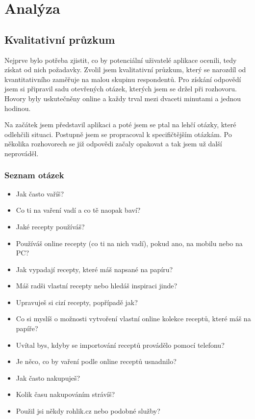 
\chapter{Analýza}

\section{Kvalitativní průzkum}

Nejprve bylo potřeba zjistit, co by potenciální uživatelé aplikace ocenili, tedy získat od nich požadavky.
Zvolil jsem kvalitativní průzkum, který se narozdíl od kvantitativního zaměřuje na malou skupinu respondentů.
Pro získání odpovědí jsem si připravil sadu otevřených otázek, kterých jsem se držel při rozhovoru. Hovory byly
uskutečněny online a každy trval mezi dvaceti minutami a jednou hodinou.

Na začátek jsem představil aplikaci a poté jsem se ptal na lehčí otázky, které odlehčili situaci. Postupně jsem se
propracoval k specifičtějším otázkám. Po několika rozhovorech se již odpovědi začaly opakovat a tak jsem už další
neprováděl.

\subsection{Seznam otázek}
\begin{itemize}
    \item Jak často vaříš?
    \item Co ti na vaření vadí a co tě naopak baví?
    \item Jaké recepty používáš?
    \item Používáš online recepty (co ti na nich vadí), pokud ano, na mobilu nebo na PC?
    \item Jak vypadají recepty, které máš napsané na papíru?
    \item Máš radši vlastní recepty nebo hledáš inspiraci jinde?
    \item Upravuješ si cizí recepty, popřípadě jak?
    \item Co si myslíš o možnosti vytvoření vlastní online kolekce receptů, které máš na papíře?
    \item Uvítal bys, kdyby se importování receptů provádělo pomocí telefonu?
    \item Je něco, co by vaření podle online receptů usnadnilo?
    \item Jak často nakupuješ?
    \item Kolik času nakupováním strávíš?
    \item Použil jsi někdy rohlik.cz nebo podobné služby?
\end{itemize}

